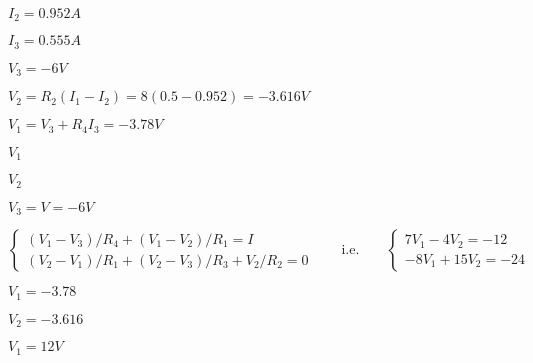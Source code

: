 {\newpage\clearpage
{}%
$I_2=0.952 A$%
\lthtmlinlinemathZ
\lthtmlcheckvsize\clearpage}

{\newpage\clearpage
{}%
$I_3=0.555 A$%
\lthtmlinlinemathZ
\lthtmlcheckvsize\clearpage}

{\newpage\clearpage
{}%
$V_3=-6V$%
\lthtmlinlinemathZ
\lthtmlcheckvsize\clearpage}

{\newpage\clearpage
{}%
$V_2=R_2(I_1-I_2)=8(0.5-0.952)=-3.616V$%
\lthtmlinlinemathZ
\lthtmlcheckvsize\clearpage}

{\newpage\clearpage
{}%
$V_1=V_3+R_4 I_3=-3.78 V$%
\lthtmlinlinemathZ
\lthtmlcheckvsize\clearpage}

{\newpage\clearpage
{}%
$V_1$%
\lthtmlinlinemathZ
\lthtmlcheckvsize\clearpage}

{\newpage\clearpage
{}%
$V_2$%
\lthtmlinlinemathZ
\lthtmlcheckvsize\clearpage}

{\newpage\clearpage
{}%
$V_3=V=-6V$%
\lthtmlinlinemathZ
\lthtmlcheckvsize\clearpage}

{\newpage\clearpage
{}%
\begin{displaymath} 
\left\{ \begin{array}{l}
  (V_1-V_3)/R_4+(V_1-V_2)/R_1=I \\
  (V_2-V_1)/R_1+(V_2-V_3)/R_3+V_2/R_2=0 \end{array} \right. 
  \;\;\;\;\;\;\;\mbox{i.e.}\;\;\;\;\;\;\;
  \left\{ \begin{array}{l}
  7V_1-4V_2=-12 \\
  -8V_1+15V_2=-24 \end{array} \right. \end{displaymath}%
\lthtmldisplayZ
\lthtmlcheckvsize\clearpage}

{\newpage\clearpage
{}%
$V_1=-3.78$%
\lthtmlinlinemathZ
\lthtmlcheckvsize\clearpage}

{\newpage\clearpage
{}%
$V_2=-3.616$%
\lthtmlinlinemathZ
\lthtmlcheckvsize\clearpage}

{\newpage\clearpage
{}%
$V_1=12 V$%
\lthtmlinlinemathZ
\lthtmlcheckvsize\clearpage}

